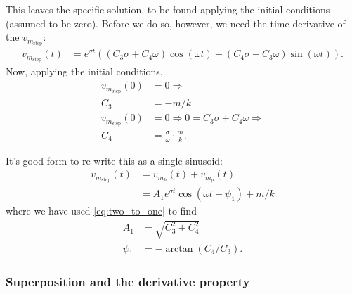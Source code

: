 \documentclass[dynamic_systems.tex]{subfiles}
\begin{document}
This leaves the specific solution, to be found applying the initial conditions (assumed to be zero).
Before we do so, however, we need the time-derivative of the $v_{m_\text{step}}$:
\tags{}
\begin{align}
	\dot{v}_{m_\text{step}}(t) &= e^{\sigma t} 
	\left(
		(C_3\sigma+C_4\omega) \cos(\omega t) +
		(C_4\sigma-C_3\omega) \sin(\omega t)
	\right).
\end{align}
Now, applying the initial conditions,
\begin{subequations}
\begin{align}
	v_{m_\text{step}}(0) &= 0 \Rightarrow \\
		C_3 &= -m/k \\
	\dot{v}_{m_\text{step}}(0) &= 0 \Rightarrow
		0 = C_3\sigma + C_4\omega \Rightarrow \\
		C_4 &= \frac{\sigma}{\omega}\cdot\frac{m}{k}.
\end{align}
\end{subequations}

It's good form to re-write this as a single sinusoid:
\begin{subequations}
\begin{align}
	v_{m_\text{step}}(t) &= v_{m_h}(t) + v_{m_p}(t) \\
	&= A_1 e^{\sigma t} \cos(\omega t + \psi_1)
		+
		m/k
\end{align}
\end{subequations}
where we have used \autoref{eq:two_to_one} to find
\begin{subequations}
\begin{align}
	A_1 &= \sqrt{C_3^2 + C_4^2} \\
	\psi_1 &= -\arctan(C_4/C_3).
\end{align}
\end{subequations}

\subsubsection{Superposition and the derivative property}
\end{document}
